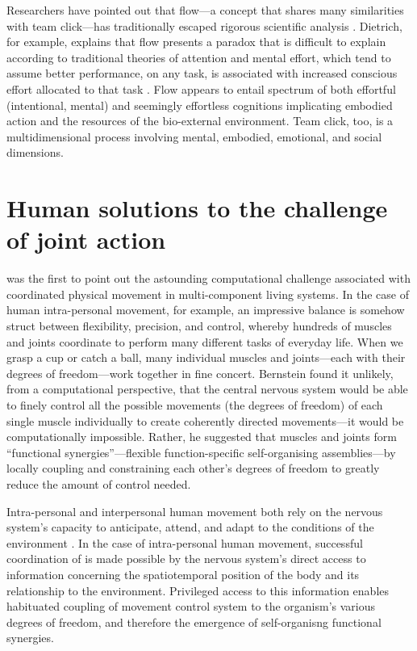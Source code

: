 \begin{CJK}{UTF8}{gbsn}
Researchers have pointed out that flow---a concept that shares many similarities with team click---has traditionally escaped rigorous scientific analysis \citep{Dietrich2010a,Slingerland2014}.  Dietrich, for example, explains that flow presents a paradox that is difficult to explain according to traditional theories of attention and mental effort, which tend to assume better performance, on any task, is associated with increased conscious effort allocated to that task \citep{Dietrich2004b}.  Flow appears to entail spectrum of both effortful (intentional, mental) and seemingly effortless cognitions implicating embodied action and the resources of the bio-external environment.  Team click, too, is a multidimensional process involving mental, embodied, emotional, and social dimensions.


\section{Human solutions to the challenge of joint action\label{sect:dfProblem}}

\textcite{Bernstein1967} was the first to point out the astounding computational challenge associated with coordinated physical movement in multi-component living systems.  In the case of human intra-personal movement, for example, an impressive balance is somehow struct between flexibility, precision, and control, whereby hundreds of muscles and joints coordinate to perform many different tasks of everyday life.  When we grasp a cup or catch a ball, many individual muscles and joints---each with their degrees of freedom---work together in fine concert.  Bernstein found it unlikely, from a computational perspective, that the central nervous system would be able to finely control all the possible movements (the degrees of freedom) of each single muscle individually to create coherently directed movements---it would be computationally impossible.  Rather, he suggested that muscles and joints form  ``functional synergies''---flexible function-specific self-organising assemblies---by locally coupling and constraining each other’s degrees of freedom to greatly reduce the amount of control needed.

Intra-personal and interpersonal human movement both rely on the nervous system’s capacity to anticipate, attend, and adapt to the conditions of the environment \citep{Keller2014}.  In the case of intra-personal human movement, successful coordination of is made possible by the nervous system's direct access to information concerning the spatiotemporal position of the body and its relationship to the environment.  Privileged access to this information enables habituated coupling of movement control system to the organism's various degrees of freedom, and therefore the emergence of self-organisng functional synergies.


\end{CJK}
